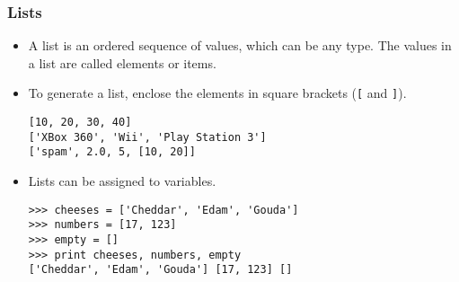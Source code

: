 \documentclass{beamer}
\begin{document}
\begin{frame}[fragile]
\frametitle{Lists}
\begin{itemize}

\item A \alert{ list} is an ordered sequence of values, which can be any type.  The values in
a list are called \alert{ elements} or \alert{items}.
\item To generate a list, enclose the elements in square brackets (\verb"[" and \verb"]").
\small
\begin{verbatim}
[10, 20, 30, 40]
['XBox 360', 'Wii', 'Play Station 3']
['spam', 2.0, 5, [10, 20]]
\end{verbatim}
\normalsize
\item Lists can be assigned to variables.
\small
\begin{verbatim}
>>> cheeses = ['Cheddar', 'Edam', 'Gouda']
>>> numbers = [17, 123]
>>> empty = []
>>> print cheeses, numbers, empty
['Cheddar', 'Edam', 'Gouda'] [17, 123] []
\end{verbatim}
\normalsize
\end{itemize}
\end{frame}
\end{document}
